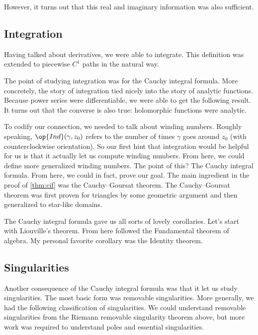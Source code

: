 \documentclass[../notes.tex]{subfiles}
\begin{document}
However, it turns out that this real and imaginary information was also sufficient.
\cauchyriemannsufficient*

\subsection{Integration}
Having talked about derivatives, we were able to integrate.
\integraldefi*
\noindent This definition was extended to piecewise $C^1$ paths in the natural way.

The point of studying integration was for the Cauchy integral formula. More concretely, the story of integration tied nicely into the story of analytic functions.
\analyticdefi*
\noindent Because power series were differentiable, we were able to get the following result.
\analyticishololem*
\noindent It turns out that the converse is also true: holomorphic functions were analytic.

To codify our connection, we needed to talk about winding numbers. Roughly speaking, $\op{Ind}(\gamma,z_0)$ refers to the number of times $\gamma$ goes around $z_0$ (with counterclockwise orientation). So our first hint that integration would be helpful for us is that it actually let us compute winding numbers.
\windingnumberformulalem*
\noindent From here, we could define more generalized winding numbers.
\indexdefi*
\noindent The point of this? The Cauchy integral formula.
\thmcif*
\noindent From here, we could in fact, prove our goal.
\holoisanacor*
\noindent The main ingredient in the proof of \autoref{thm:cif} was the Cauchy--Goursat theorem.
\starlikecg*
\noindent The Cauchy--Goursat theorem was first proven for triangles by some geometric argument and then generalized to star-like domains.

The Cauchy integral formula gave us all sorts of lovely corollaries. Let's start with Liouville's theorem.
\liovillethm*
\noindent From here followed the Fundamental theorem of algebra.
\ftathm*
\noindent My personal favorite corollary was the Identity theorem.
\identitythm*

\subsection{Singularities}
Another consequence of the Cauchy integral formula was that it let us study singularities. The most basic form was removable singularities.
\removablethm*
\noindent More generally, we had the following classification of singularities.
\basicsingularitydefi*
\isosingularitydefi*
\noindent We could understand removable singularities from the Riemann removable singularity theorem above, but more work was required to understand poles and essential singularities.
\end{document}
